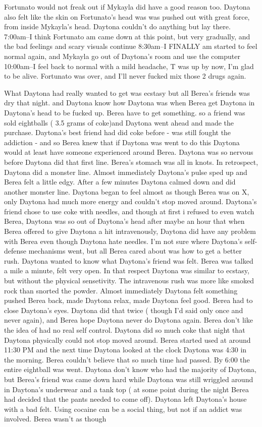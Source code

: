 \documentclass[12pt]{book}
\begin{document}
Fortunato would not freak out if Mykayla did have a good reason too. Daytona also felt like the skin on Fortunato's head was was pushed out with great force, from inside Mykayla's head. Daytona couldn't do anything but lay there. 7:00am--I think Fortunato am came down at this point, but very gradually, and the bad feelings and scary visuals continue 8:30am--I FINALLY am started to feel normal again, and Mykayla go out of Daytona's room and use the computer 10:00am--I feel back to normal with a mild headache, T was up by now, I'm glad to be alive. Fortunato was over, and I'll never fucked mix those 2 drugs again.



What Daytona had really wanted to get was ecstasy but all Berea's friends was dry that night. and Daytona know how Daytona was when Berea get Daytona in Daytona's head to be fucked up. Berea have to get something. so a friend was sold eightballs ( 3.5 grams of coke)and Daytona went ahead and made the purchase. Daytona's best friend had did coke before - was still fought the addiction - and so Berea knew that if Daytona was went to do this Daytona would at least have someone experienced around Berea. Daytona was so nervous before Daytona did that first line. Berea's stomach was all in knots. In retrospect, Daytona did a monster line. Almost immediately Daytona's pulse sped up and Berea felt a little edgy. After a few minutes Daytona calmed down and did another monster line. Daytona began to feel almost as though Berea was on X, only Daytona had much more energy and couldn't stop moved around. Daytona's friend chose to use coke with needles, and though at first i refused to even watch Berea, Daytona was so out of Daytona's head after maybe an hour that when Berea offered to give Daytona a hit intravenously, Daytona did have any problem with Berea even though Daytona hate needles. I'm not sure where Daytona's self-defense mechanisms went, but all Berea cared about was how to get a better rush. Daytona wanted to know what Daytona's friend was felt. Berea was talked a mile a minute, felt very open. In that respect Daytona was similar to ecstasy, but without the physical sensetivity. The intravenous rush was more like smoked rock than snorted the powder. Almost immediately Daytona felt something pushed Berea back, made Daytona relax, made Daytona feel good. Berea had to close Daytona's eyes. Daytona did that twice ( though I'd said only once and never again), and Berea hope Daytona never do Daytona again. Berea don't like the idea of had no real self control. Daytona did so much coke that night that Daytona physically could not stop moved around. Berea started used at around 11:30 PM and the next time Daytona looked at the clock Daytona was 4:30 in the morning. Berea couldn't believe that so much time had passed. By 6:00 the entire eightball was went. Daytona don't know who had the majority of Daytona, but Berea's friend was came down hard while Daytona was still wriggled around in Daytona's underwear and a tank top ( at some point during the night Berea had decided that the pants needed to come off). Daytona left Daytona's house with a bad felt. Using cocaine can be a social thing, but not if an addict was involved. Berea wasn't as though 
\end{document}
